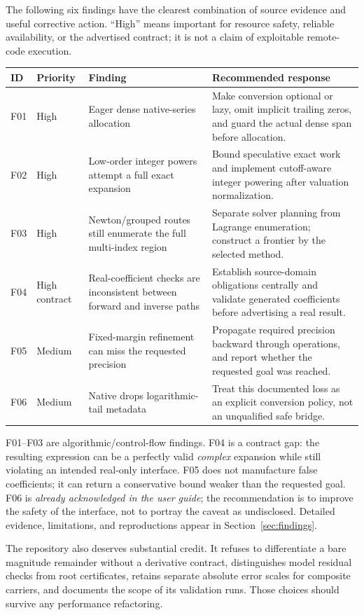 \documentclass[11pt,a4paper]{article}
\newcommand{\code}[1]{\texttt{\detokenize{#1}}}
\begin{document}
The following six findings have the clearest combination of source evidence and useful corrective action. ``High'' means important for resource safety, reliable availability, or the advertised contract; it is not a claim of exploitable remote-code execution.

\begin{longtable}{@{}L{12mm}L{18mm}L{48mm}L{77mm}@{}}
\toprule ID & Priority & Finding & Recommended response\\\midrule\endhead
F01 & High & Eager dense native-series allocation & Make conversion optional or lazy, omit implicit trailing zeros, and guard the actual dense span before allocation.\\
F02 & High & Low-order integer powers attempt a full exact expansion & Bound speculative exact work and implement cutoff-aware integer powering after valuation normalization.\\
F03 & High & Newton/grouped routes still enumerate the full multi-index region & Separate solver planning from Lagrange enumeration; construct a frontier by the selected method.\\
F04 & High contract & Real-coefficient checks are inconsistent between forward and inverse paths & Establish source-domain obligations centrally and validate generated coefficients before advertising a real result.\\
F05 & Medium & Fixed-margin refinement can miss the requested precision & Propagate required precision backward through operations, and report whether the requested goal was reached.\\
F06 & Medium & Native \code{SeriesData} drops logarithmic-tail metadata & Treat this documented loss as an explicit conversion policy, not an unqualified safe bridge.\\
\bottomrule
\end{longtable}

F01--F03 are algorithmic/control-flow findings. F04 is a contract gap: the resulting expression can be a perfectly valid \emph{complex} expansion while still violating an intended real-only interface. F05 does not manufacture false coefficients; it can return a conservative bound weaker than the requested goal. F06 is \emph{already acknowledged in the user guide}; the recommendation is to improve the safety of the interface, not to portray the caveat as undisclosed. Detailed evidence, limitations, and reproductions appear in Section~\ref{sec:findings}.

The repository also deserves substantial credit. It refuses to differentiate a bare magnitude remainder without a derivative contract, distinguishes model residual checks from root certificates, retains separate absolute error scales for composite carriers, and documents the scope of its validation runs. Those choices should survive any performance refactoring.\cite{ops,cert,core,native,validation}
\end{document}
